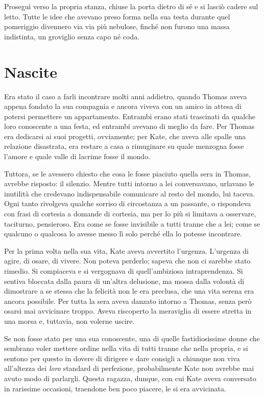 \documentclass[a4paper,oneside,11pt]{memoir}
\begin{document}
Proseguì verso la propria stanza, chiuse la porta dietro di sé e si lasciò
cadere sul letto. Tutte le idee che avevano preso forma nella sua testa durante
quel pomeriggio divennero via via più nebulose, finché non furono una massa
indistinta, un groviglio senza capo né coda.

\chapter{Nascite}

Era stato il caso a farli incontrare molti anni addietro, quando Thomas aveva
appena fondato la sua compagnia e ancora viveva con un amico in attesa di
potersi permettere un appartamento. Entrambi erano stati trascinati da qualche
loro conoscente a una festa, ed entrambi avevano di meglio da fare. Per Thomas
era dedicarsi ai suoi progetti, ovviamente; per Kate, che aveva alle spalle una
relazione disastrata, era restare a casa a rimuginare su quale menzogna fosse
l'amore e quale valle di lacrime fosse il mondo.

Tuttora, se le avessero chiesto che cosa le fosse piaciuto quella sera in
Thomas, avrebbe risposto: il silenzio. Mentre tutti intorno a lei conversavano,
urlavano le inutilità che credevano indispensabile comunicare al resto del
mondo, lui taceva. Ogni tanto rivolgeva qualche sorriso di circostanza a un
passante, o rispondeva con frasi di cortesia a domande di cortesia, ma per lo
più si limitava a osservare, taciturno, pensieroso. Era come se fosse invisibile
a tutti tranne che a lei; come se qualcuno o qualcosa lo avesse messo lì solo
perché ella lo potesse incontrare.

Per la prima volta nella sua vita, Kate aveva avvertito l'urgenza. L'urgenza di
agire, di osare, di vivere. Non poteva perderlo; sapeva che non ci sarebbe stato
rimedio. Si compiaceva e si vergognava di quell'ambiziosa intraprendenza. Si
sentiva bloccata dalla paura di un'altra delusione, ma mossa dalla volontà di
dimostrare a se stessa che la felicità non le era preclusa, che una vita serena
era ancora possibile. Per tutta la sera aveva danzato intorno a Thomas, senza
però osarsi mai avvicinare troppo. Aveva riscoperto la meraviglia di essere
stretta in una morsa e, tuttavia, non volerne uscire.

Se non fosse stato per una sua conoscente, una di quelle fastidiosissime donne
che sembrano voler mettere ordine nella vita di tutti tranne che nella propria,
e si sentono per questo in dovere di dirigere e dare consigli a chiunque non
viva all'altezza dei \emph{loro} standard di perfezione, probabilmente Kate non
avrebbe mai avuto modo di parlargli. Questa ragazza, dunque, con cui Kate aveva
conversato in rarissime occasioni, traendone ben poco piacere, le si era
avvicinata.
\end{document}
